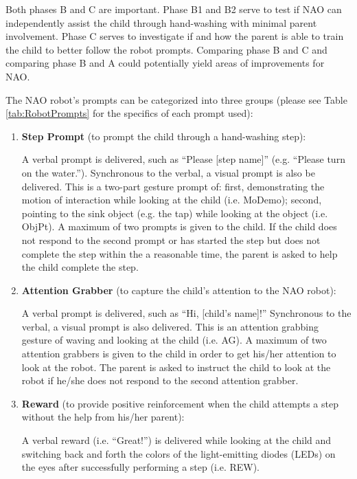 \documentclass{ut-thesis}
\begin{document}
Both phases B and C are important.  Phase B1 and B2 serve to test if NAO can independently assist the child through hand-washing with minimal parent involvement.  Phase C serves to investigate if  and how the parent is able to train the child to better follow the robot prompts.  Comparing phase B and C and comparing phase B and A could potentially yield areas of improvements for NAO.

The NAO robot's prompts can be categorized into three groups (please see Table \ref{tab:RobotPrompts} for the specifics of each prompt used):
\begin{enumerate}
	\item \textbf{Step Prompt} (to prompt the child through a hand-washing step):

	A verbal prompt is delivered, such as “Please [step name]” (e.g. “Please turn on the water.”).  Synchronous to the verbal, a visual prompt is also be delivered. This is a two-part gesture prompt of: first, demonstrating the motion of interaction while looking at the child (i.e. MoDemo); second, pointing to the sink object (e.g. the tap) while looking at the object (i.e. ObjPt). A maximum of two prompts is given to the child. If the child does not respond to the second prompt or has started the step but does not complete the step within the a reasonable time, the parent is asked to help the child complete the step. 

	\item \textbf{Attention Grabber} (to capture the child's attention to the NAO robot): 

	A verbal prompt is delivered, such as “Hi, [child's name]!”  Synchronous to the verbal, a visual prompt is also delivered. This is an attention grabbing gesture of waving and looking at the child (i.e. AG). A maximum of two attention grabbers is given to the child in order to get his/her attention to look at the robot.  The parent is asked to instruct the child to look at the robot if he/she does not respond to the second attention grabber. 

	\item \textbf{Reward} (to provide positive reinforcement when the child attempts a step without the help from his/her parent): 

	A verbal reward (i.e. “Great!”) is delivered while looking at the child and switching back and forth the colors of the light-emitting diodes (LEDs) on the eyes after successfully performing a step (i.e. REW).
\end{enumerate}
\end{document}
